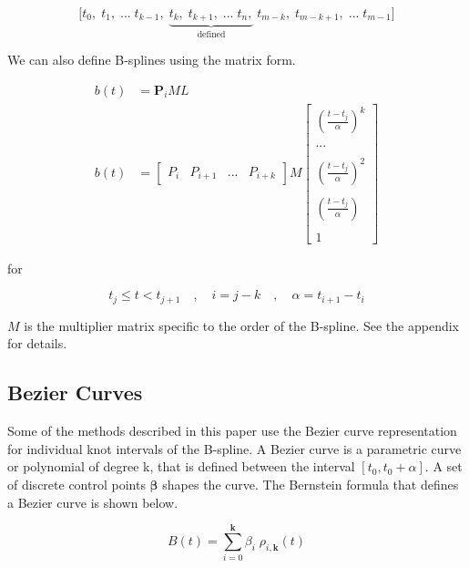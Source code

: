 \documentclass{article}
\begin{document}
\begin{equation}
    \Big[ t_0, \; t_1,  \; ... \; t_{k-1} , \; \underbrace{t_k, \; t_{k+1}, \; ... \; t_n,}_{\text{defined}} \; t_{m-k}, \; t_{m-k+1}, \; ... \; t_{m-1} \Big]
\end{equation}
  
  We can also define B-splines using the matrix form.
  
\begin{equation}
\begin{aligned}
        b(t) & = \textbf{P}_i M L \\
           b(t) & = \begin{bmatrix} P_{i} & P_{i+1} & ... & P_{i+k}\end{bmatrix} M \begin{bmatrix} (\frac{t-t_j}{\alpha})^k \\ \\ ... \\ \\ (\frac{t-t_j}{\alpha})^2 \\ \\ (\frac{t-t_j}{\alpha}) \\ \\ 1 \end{bmatrix}
\end{aligned}
\end{equation}

for 

    \begin{equation}
        t_j \leq t < t_{j+1} \quad , \quad i = j-k \quad , \quad \alpha = t_{i+1} - t_i
    \end{equation}

\(M\) is the multiplier matrix specific to the order of the B-spline. See the appendix for details.

\subsection{Bezier Curves}
    Some of the methods described in this paper use the Bezier curve representation for individual knot intervals of the B-spline. A Bezier curve is a parametric curve or polynomial of degree k, that is defined between the interval \([t_0, t_0 + \alpha]\). A set of discrete control points \(\boldsymbol{\beta}\) shapes the curve. The Bernstein formula that defines a Bezier curve is shown below.

\begin{equation}
    B(t) = \sum_{i=0}^{\textbf{k}}\beta_i \;\rho_{i,\textbf{k}}(t)
\end{equation}
\end{document}
